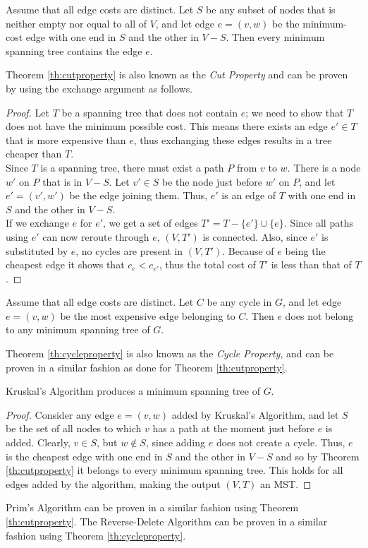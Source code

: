 \documentclass[]{article}
\begin{document}
		\begin{theorem}\label{th:cutproperty}Assume that all edge costs are distinct. Let $S$ be any subset of nodes that is neither empty nor equal to all of $V$, and let edge $e = (v,w)$ be the minimum-cost edge with one end in $S$ and the other in $V-S$. Then every minimum spanning tree contains the edge $e$.\end{theorem}
		Theorem \ref{th:cutproperty} is also known as the \emph{Cut Property} and can be proven by using the exchange argument as follows.
		\begin{proof}
			Let $T$ be a spanning tree that does not contain $e$; we need to show that $T$ does not have the minimum possible cost. This means there exists an edge $e' \in T$ that is more expensive than $e$, thus exchanging these edges results in a tree cheaper than $T$. \\
			Since $T$ is a spanning tree, there must exist a path $P$ from $v$ to $w$. There is a node $w'$ on $P$ that is in $V - S$. Let $v' \in S$ be the node just before $w'$ on $P$, and let $e' = (v',w')$ be the edge joining them. Thus, $e'$ is an edge of $T$ with one end in $S$ and the other in $V-S$. \\
			If we exchange $e$ for $e'$, we get a set of edges $T' = T - \{e'\} \cup \{e\}$. Since all paths using $e'$ can now reroute through $e$, $(V,T')$ is connected. Also, since $e'$ is substituted by $e$, no cycles are present in $(V,T')$. Because of $e$ being the cheapest edge it shows that $c_e < c_{e'}$, thus the total cost of $T'$ is less than that of $T$.
		\end{proof}
		\begin{theorem}\label{th:cycleproperty}Assume that all edge costs are distinct. Let $C$ be any cycle in $G$, and let edge $e = (v,w)$ be the most expensive edge belonging to $C$. Then $e$ does not belong to any minimum spanning tree of $G$.\end{theorem}
		Theorem \ref{th:cycleproperty} is also known as the \emph{Cycle Property}, and can be proven in a similar fashion as done for Theorem \ref{th:cutproperty}.
		\begin{theorem}\label{th:kruskal}Kruskal's Algorithm produces a minimum spanning tree of $G$.\end{theorem}
		\begin{proof}
			Consider any edge $e = (v,w)$ added by Kruskal's Algorithm, and let $S$ be the set of all nodes to which $v$ has a path at the moment just before $e$ is added. Clearly, $v \in S$, but $w \notin S$, since adding $e$ does not create a cycle. Thus, $e$ is the cheapest edge with one end in $S$ and the other in $V-S$ and so by Theorem \ref{th:cutproperty} it belongs to every minimum spanning tree. This holds for all edges added by the algorithm, making the output $(V,T)$ an MST.
		\end{proof}
		Prim's Algorithm can be proven in a similar fashion using Theorem \ref{th:cutproperty}. The Reverse-Delete Algorithm can be proven in a similar fashion using Theorem \ref{th:cycleproperty}.
\end{document}

